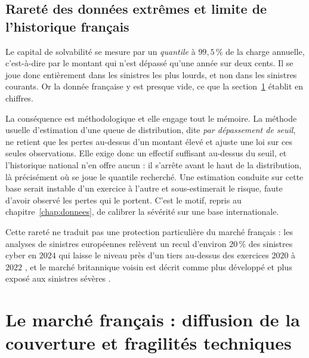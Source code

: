 \subsection{Rareté des données extrêmes et limite de l'historique français}
\label{subsec:donnees-extremes}

Le capital de solvabilité se mesure par un \emph{quantile} à $99{,}5\,\%$ de la charge annuelle,
c'est-à-dire par le montant qui n'est dépassé qu'une année sur deux cents. Il se joue donc
entièrement dans les sinistres les plus lourds, et non dans les sinistres courants. Or la donnée
française y est presque vide, ce que la section~\ref{sec:marche-cyber-francais} établit en
chiffres.

La conséquence est méthodologique et elle engage tout le mémoire. La méthode usuelle d'estimation
d'une queue de distribution, dite \emph{par dépassement de seuil}, ne retient que les pertes
au-dessus d'un montant élevé et ajuste une loi sur ces seules observations. Elle exige donc un
effectif suffisant au-dessus du seuil, et l'historique national n'en offre aucun : il s'arrête
avant le haut de la distribution, là précisément où se joue le quantile recherché. Une estimation
conduite sur cette base serait instable d'un exercice à l'autre et sous-estimerait le risque,
faute d'avoir observé les pertes qui le portent. C'est le motif, repris au
chapitre~\ref{chap:donnees}, de calibrer la sévérité sur une base internationale.

Cette rareté ne traduit pas une protection particulière du marché français : les analyses de
sinistres européennes relèvent un recul d'environ $20\,\%$ des sinistres cyber en $2024$ qui
laisse le niveau près d'un tiers au-dessus des exercices $2020$ à $2022$ \citep{marsh2025}, et le
marché britannique voisin est décrit comme plus développé et plus exposé aux sinistres sévères
\citep{dsit2025}.

\section{Le marché français : diffusion de la couverture et fragilités techniques}
\label{sec:marche-cyber-francais}


